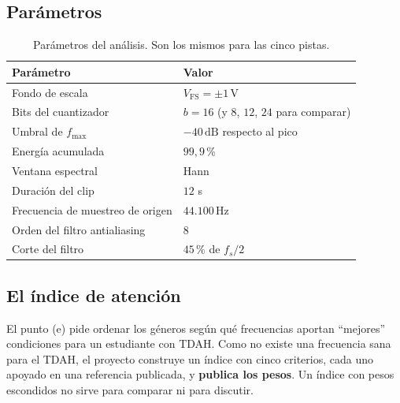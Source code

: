 \documentclass[11pt,a4paper]{article}
\newcommand{\fs}{f_s}
\newcommand{\fmax}{f_{\max}}
\newcommand{\Vfs}{V_{\mathrm{FS}}}
\newcommand{\dB}{\,\mathrm{dB}}
\newcommand{\Hz}{\,\mathrm{Hz}}
\newcommand{\V}{\,\mathrm{V}}
\begin{document}
\subsection{Parámetros}

\begin{table}[H]
\centering
\small
\begin{tabular}{@{}l l@{}}
\toprule
\textbf{Parámetro} & \textbf{Valor} \\
\midrule
Fondo de escala & \(\Vfs = \pm1\V\) \\
Bits del cuantizador & \(b = 16\) (y \(8\), \(12\), \(24\) para comparar) \\
Umbral de \(\fmax\) & \(-40\dB\) respecto al pico \\
Energía acumulada & \(99{,}9\)\,\% \\
Ventana espectral & Hann \\
Duración del clip & \(12\) s \\
Frecuencia de muestreo de origen & \(44.100\Hz\) \\
Orden del filtro antialiasing & 8 \\
Corte del filtro & \(45\)\,\% de \(\fs/2\) \\
\bottomrule
\end{tabular}
\caption{Parámetros del análisis. Son los mismos para las cinco pistas.}
\label{tab:parametros}
\end{table}

\subsection{El índice de atención}

El punto (e) pide ordenar los géneros según qué frecuencias aportan ``mejores''
condiciones para un estudiante con TDAH. Como no existe una frecuencia sana
para el TDAH, el proyecto construye un índice con cinco criterios, cada uno
apoyado en una referencia publicada, y \textbf{publica los pesos}. Un índice
con pesos escondidos no sirve para comparar ni para discutir.
\end{document}
